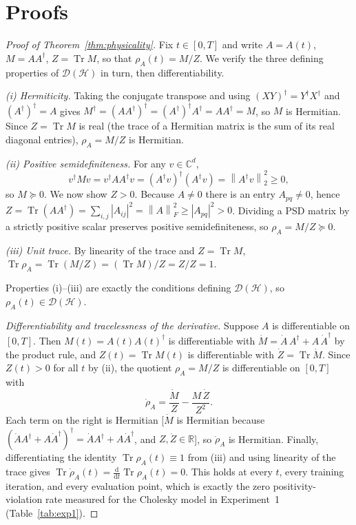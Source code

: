 \documentclass[twocolumn,aps,prxquantum,superscriptaddress,nofootinbib,floatfix,longbibliography]{revtex4-2}
\DeclareMathOperator{\Tr}{Tr}
\newcommand{\R}{\mathbb{R}}
\newcommand{\C}{\mathbb{C}}
\newcommand{\calD}{\mathcal{D}}
\newcommand{\dd}{\mathrm{d}}
\newcommand{\norm}[1]{\left\lVert #1 \right\rVert}
\newcommand{\abs}[1]{\left\lvert #1 \right\rvert}
\newcommand{\hilb}{\mathcal{H}}
\begin{document}
\section{Proofs}
\label{sec:appendix_proofs}

\begin{proof}[Proof of Theorem~\ref{thm:physicality}]
Fix $t\in[0,T]$ and write $A=A(t)$, $M=AA^\dagger$, $Z=\Tr M$, so that $\rho_A(t)=M/Z$. We verify the three defining properties of $\calD(\hilb)$ in turn, then differentiability.

\emph{(i) Hermiticity.} Taking the conjugate transpose and using $(XY)^\dagger=Y^\dagger X^\dagger$ and $(A^\dagger)^\dagger=A$ gives $M^\dagger=(AA^\dagger)^\dagger=(A^\dagger)^\dagger A^\dagger=AA^\dagger=M$, so $M$ is Hermitian. Since $Z=\Tr M$ is real (the trace of a Hermitian matrix is the sum of its real diagonal entries), $\rho_A=M/Z$ is Hermitian.

\emph{(ii) Positive semidefiniteness.} For any $v\in\C^d$,
\[
v^\dagger M v = v^\dagger A A^\dagger v = (A^\dagger v)^\dagger (A^\dagger v)=\norm{A^\dagger v}_2^2\ge 0,
\]
so $M\succeq0$. We now show $Z>0$. Because $A\ne0$ there is an entry $A_{pq}\ne0$, hence $Z=\Tr(AA^\dagger)=\sum_{i,j}\abs{A_{ij}}^2=\norm{A}_F^2\ge\abs{A_{pq}}^2>0$. Dividing a PSD matrix by a strictly positive scalar preserves positive semidefiniteness, so $\rho_A=M/Z\succeq0$.

\emph{(iii) Unit trace.} By linearity of the trace and $Z=\Tr M$, $\Tr\rho_A=\Tr(M/Z)=(\Tr M)/Z=Z/Z=1$.

Properties (i)--(iii) are exactly the conditions defining $\calD(\hilb)$, so $\rho_A(t)\in\calD(\hilb)$.

\emph{Differentiability and tracelessness of the derivative.} Suppose $A$ is differentiable on $[0,T]$. Then $M(t)=A(t)A(t)^\dagger$ is differentiable with $\dot M=\dot A\,A^\dagger+A\,\dot A^\dagger$ by the product rule, and $Z(t)=\Tr M(t)$ is differentiable with $\dot Z=\Tr\dot M$. Since $Z(t)>0$ for all $t$ by (ii), the quotient $\rho_A=M/Z$ is differentiable on $[0,T]$ with
\[
\dot\rho_A=\frac{\dot M}{Z}-\frac{M\,\dot Z}{Z^2}.
\]
Each term on the right is Hermitian [$\dot M$ is Hermitian because $(\dot A A^\dagger+A\dot A^\dagger)^\dagger=\dot A A^\dagger+A\dot A^\dagger$, and $Z,\dot Z\in\R$], so $\dot\rho_A$ is Hermitian. Finally, differentiating the identity $\Tr\rho_A(t)\equiv1$ from (iii) and using linearity of the trace gives $\Tr\dot\rho_A(t)=\tfrac{\dd}{\dd t}\Tr\rho_A(t)=0$. This holds at every $t$, every training iteration, and every evaluation point, which is exactly the zero positivity-violation rate measured for the Cholesky model in Experiment~1 (Table~\ref{tab:exp1}).
\end{proof}
\end{document}
